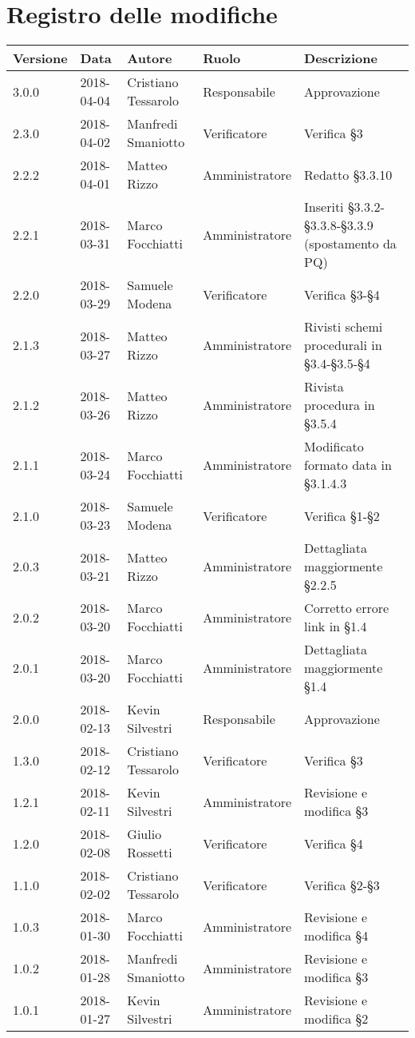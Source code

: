 \documentclass[./NormediProgetto.tex]{subfiles}
\begin{document}
\chapter*{Registro delle modifiche}
\setlength\LTleft{-22mm}
\begin{longtable}{|p{20mm}|p{20mm}|p{40mm}|p{30mm}|p{50mm}|}
	\hline
	\textbf{Versione} & \textbf{Data} & \textbf{Autore} & \textbf{Ruolo} & \textbf{Descrizione} \\ \hline 
		
		3.0.0 & 2018-04-04 & Cristiano Tessarolo & Responsabile & Approvazione\\ \hline
		2.3.0 & 2018-04-02 & Manfredi Smaniotto & Verificatore &  Verifica §3\\ \hline
		2.2.2 & 2018-04-01 & Matteo Rizzo & Amministratore &  Redatto §3.3.10\\ \hline
		2.2.1 & 2018-03-31 & Marco Focchiatti & Amministratore &  Inseriti §3.3.2-§3.3.8-§3.3.9 (spostamento da PQ)\\ \hline
		2.2.0 & 2018-03-29 & Samuele Modena & Verificatore &  Verifica §3-§4\\ \hline
		2.1.3 & 2018-03-27 & Matteo Rizzo & Amministratore &  Rivisti schemi procedurali in §3.4-§3.5-§4\\ \hline
		2.1.2 & 2018-03-26 & Matteo Rizzo & Amministratore &  Rivista procedura in §3.5.4\\ \hline
		2.1.1 & 2018-03-24 & Marco Focchiatti & Amministratore &  Modificato formato data in §3.1.4.3\\ \hline
		2.1.0 & 2018-03-23 & Samuele Modena & Verificatore &  Verifica §1-§2\\ \hline
		2.0.3 & 2018-03-21 & Matteo Rizzo & Amministratore &  Dettagliata maggiormente §2.2.5\\ \hline
		2.0.2 & 2018-03-20 & Marco Focchiatti & Amministratore &  Corretto errore link in §1.4\\ \hline
		2.0.1 & 2018-03-20 & Marco Focchiatti & Amministratore &  Dettagliata maggiormente §1.4\\ 
		
		\hline
		
		2.0.0 & 2018-02-13 & Kevin Silvestri & Responsabile & Approvazione\\ \hline
		1.3.0 & 2018-02-12 & Cristiano Tessarolo & Verificatore &  Verifica §3\\ \hline
		1.2.1 & 2018-02-11 & Kevin Silvestri & Amministratore & Revisione e modifica §3\\ \hline
		1.2.0 & 2018-02-08 & Giulio Rossetti & Verificatore & Verifica §4\\ \hline  
		1.1.0 & 2018-02-02 & Cristiano Tessarolo & Verificatore & Verifica §2-§3\\ \hline 
		1.0.3 & 2018-01-30 & Marco Focchiatti & Amministratore & Revisione e modifica §4\\ \hline 
		1.0.2 & 2018-01-28 & Manfredi Smaniotto & Amministratore & Revisione e modifica §3\\ \hline 
		1.0.1 & 2018-01-27 & Kevin Silvestri & Amministratore & Revisione e modifica §2\\
		

\end{longtable}
\end{document}
